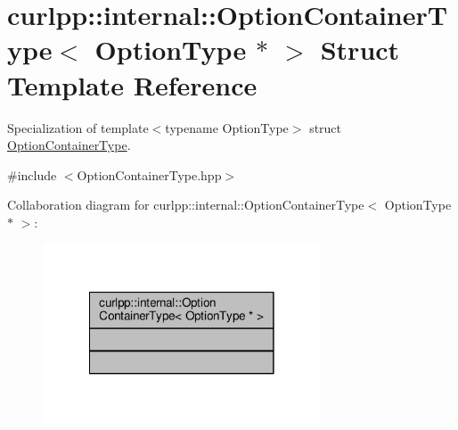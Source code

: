 \hypertarget{structcurlpp_1_1internal_1_1OptionContainerType_3_01OptionType_01_5_01_4}{\section{curlpp\-:\-:internal\-:\-:Option\-Container\-Type$<$ Option\-Type $\ast$ $>$ Struct Template Reference}
\label{structcurlpp_1_1internal_1_1OptionContainerType_3_01OptionType_01_5_01_4}
}


Specialization of template$<$typename Option\-Type$>$ struct \hyperlink{structcurlpp_1_1internal_1_1OptionContainerType}{Option\-Container\-Type}.  




{\ttfamily \#include $<$Option\-Container\-Type.\-hpp$>$}



Collaboration diagram for curlpp\-:\-:internal\-:\-:Option\-Container\-Type$<$ Option\-Type $\ast$ $>$\-:\nopagebreak
\begin{figure}[H]
\begin{center}
\leavevmode
\includegraphics[width=234pt]{structcurlpp_1_1internal_1_1OptionContainerType_3_01OptionType_01_5_01_4__coll__graph}
\end{center}
\end{figure}
